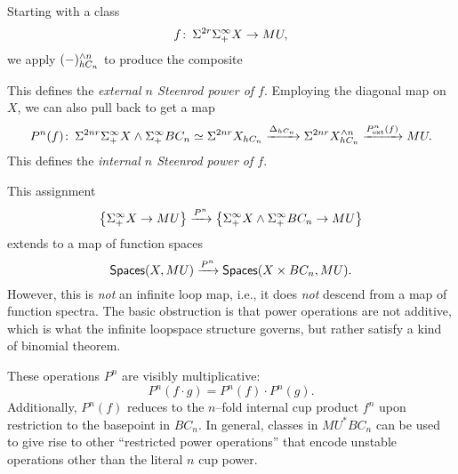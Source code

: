 \begin{definition}
Starting with a class \[f\colon\thinspace \Sigma^{2r} \Sigma^\infty_+ X \to MU,\] we apply $(-)^{\wedge n}_{hC_n}$ to produce the composite
\begin{center}
\end{center}
This defines the \textit{external $n${\th} Steenrod power of $f$}.  Employing the diagonal map on $X$, we can also pull back to get a map \[P^n(f)\colon\thinspace \Sigma^{2nr} \Sigma^\infty_+ X \wedge \Sigma^\infty_+ BC_n \simeq \Sigma^{2nr} X_{hC_n} \xrightarrow{\Delta_{hC_n}} \Sigma^{2nr} X^{\wedge n}_{hC_n} \xrightarrow{P^n_{\mathrm{ext}}(f)} MU.\]  This defines the \textit{internal $n${\th} Steenrod power of $f$}.
\end{definition}

\begin{remark}
This assignment \[\left\{ \Sigma^\infty_+ X \to MU \right\} \xrightarrow{P^n} \left\{ \Sigma^\infty_+ X \wedge \Sigma^\infty_+ BC_n \to MU \right\}\] extends to a map of function spaces \[\mathsf{Spaces}(X, MU) \xrightarrow{P^n} \mathsf{Spaces}(X \times BC_n, MU).\]  However, this is \emph{not} an infinite loop map, i.e., it does \emph{not} descend from a map of function spectra.  The basic obstruction is that power operations are not additive, which is what the infinite loopspace structure governs, but rather satisfy a kind of binomial theorem.
\end{remark}

\begin{remark}
These operations $P^n$ are visibly multiplicative: \[P^n(f \cdot g) = P^n(f) \cdot P^n(g).\]  Additionally, $P^n(f)$ reduces to the $n$--fold internal cup product $f^{n}$ upon restriction to the basepoint in $BC_n$.  In general, classes in $MU^* BC_n$ can be used to give rise to other ``restricted power operations'' that encode unstable operations other than the literal $n${\th} cup power.
\end{remark}

